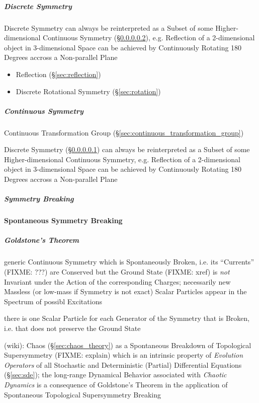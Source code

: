 \subparagraph{Discrete Symmetry}\label{sec:discrete_symmetry}\hfill

Discrete Symmetry can always be reinterpreted as a Subset of some
Higher-dimensional Continuous Symmetry (\S\ref{sec:continuous_symmetry}), e.g.
Reflection of a 2-dimensional object in 3-dimensional Space can be achieved by
Continuously Rotating 180 Degrees accross a Non-parallel Plane

\begin{itemize}
  \item Reflection (\S\ref{sec:reflection})
  \item Discrete Rotational Symmetry (\S\ref{sec:rotation})
\end{itemize}



\subparagraph{Continuous Symmetry}\label{sec:continuous_symmetry}\hfill

Continuous Transformation Group
(\S\ref{sec:continuous_transformation_group})

Discrete Symmetry (\S\ref{sec:discrete_symmetry}) can always be reinterpreted as
a Subset of some Higher-dimensional Continuous Symmetry, e.g. Reflection of a
2-dimensional object in 3-dimensional Space can be achieved by Continuously
Rotating 180 Degrees accross a Non-parallel Plane



\subparagraph{Symmetry Breaking}\label{sec:symmetry_breaking}\hfill

\textbf{Spontaneous Symmetry Breaking}



\subparagraph{Goldstone's Theorem}\label{sec:goldstones_theorem}\hfill

generic Continuous Symmetry which is Spontaneously Broken, i.e. its ``Currents''
(FIXME: ???) are Conserved but the Ground State (FIXME: xref) is \emph{not}
Invariant under the Action of the corresponding Charges; necessarily new
Massless (or low-mass if Symmetry is not exact) Scalar Particles appear in the
Spectrum of possibl Excitations

there is one Scalar Particle for each Generator of the Symmetry that is Broken,
i.e. that does not preserve the Ground State

(wiki): Chaos (\S\ref{sec:chaos_theory}) as a Spontaneous Breakdown of
Topological Supersymmetry (FIXME: explain) which is an intrinsic property of
\emph{Evolution Operators} of all Stochastic and Deterministic (Partial)
Differential Equations (\S\ref{sec:sde}); the long-range Dynamical Behavior
associated with \emph{Chaotic Dynamics} is a consequence of Goldstone's Theorem
in the application of Spontaneous Topological Supersymmetry Breaking



